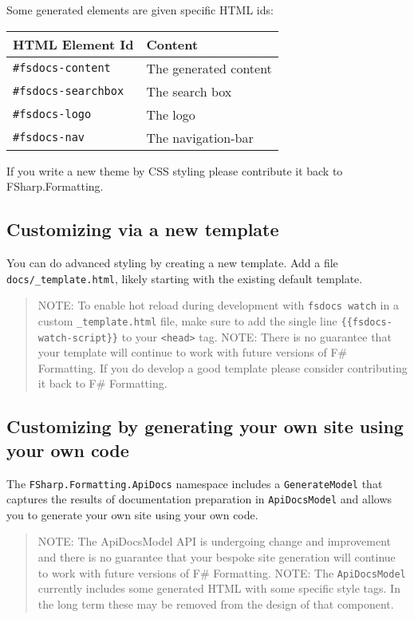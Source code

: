 \documentclass{article}
\begin{document}
Some generated elements are given specific HTML ids:
\begin{tabular}{|l|l|}\hline
\textbf{HTML Element Id} & \textbf{Content}\\ \hline\hline
\texttt{\#fsdocs-content} & The generated content\\ \hline
\texttt{\#fsdocs-searchbox} & The search box\\ \hline
\texttt{\#fsdocs-logo} & The logo\\ \hline
\texttt{\#fsdocs-nav} & The navigation-bar\\ \hline
\end{tabular}



If you write a new theme by CSS styling please contribute it back to FSharp.Formatting.
\subsection*{Customizing via a new template}



You can do advanced styling by creating a new template.  Add a file \texttt{docs/\_template.html}, likely starting
with the existing default template.
\begin{quote}


NOTE: To enable hot reload during development with \texttt{fsdocs watch} in a custom \texttt{\_template.html} file,
make sure to add the single line \texttt{\{\{fsdocs-watch-script\}\}}  to your \texttt{<head>} tag.
NOTE: There is no guarantee that your template will continue to work with future versions of F\# Formatting.
If you do develop a good template please consider contributing it back to F\# Formatting.
\end{quote}

\subsection*{Customizing by generating your own site using your own code}



The \texttt{FSharp.Formatting.ApiDocs} namespace includes a \texttt{GenerateModel} that captures
the results of documentation preparation in \texttt{ApiDocsModel} and allows you to
generate your own site using your own code.
\begin{quote}


NOTE: The ApiDocsModel API is undergoing change and improvement and there is no guarantee that your bespoke site generation will continue to work
with future versions of F\# Formatting.
NOTE: The \texttt{ApiDocsModel} currently includes some generated HTML with some specific style tags.
In the long term these may be removed from the design of that component.
\end{quote}
\end{document}
